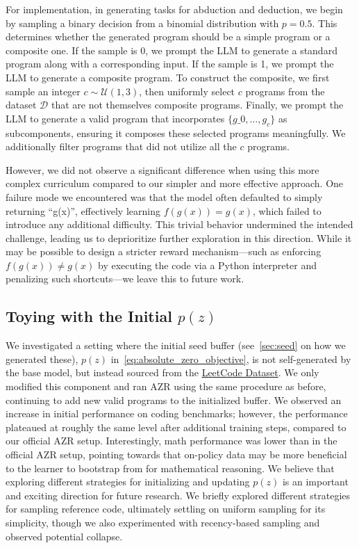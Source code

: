 \documentclass{article}
\begin{document}
For implementation, in generating tasks for abduction and deduction, we begin by sampling a binary decision from a binomial distribution with \(p = 0.5\). This determines whether the generated program should be a simple program or a composite one. If the sample is 0, we prompt the LLM to generate a standard program along with a corresponding input. If the sample is 1, we prompt the LLM to generate a composite program. To construct the composite, we first sample an integer \(c \sim \mathcal{U}(1, 3)\), then uniformly select \(c\) programs from the dataset \(\mathcal{D}\) that are not themselves composite programs. Finally, we prompt the LLM to generate a valid program that incorporates \(\{g\_0, \dots, g_c\}\) as subcomponents, ensuring it composes these selected programs meaningfully. We additionally filter programs that did not utilize all the \(c\) programs.

However, we did not observe a significant difference when using this more complex curriculum compared to our simpler and more effective approach. One failure mode we encountered was that the model often defaulted to simply returning “g(x)”, effectively learning \(f(g(x)) = g(x)\), which failed to introduce any additional difficulty. This trivial behavior undermined the intended challenge, leading us to deprioritize further exploration in this direction. While it may be possible to design a stricter reward mechanism—such as enforcing \(f(g(x)) \neq g(x)\) by executing the code via a Python interpreter and penalizing such shortcuts—we leave this to future work.

\subsection{Toying with the Initial $p(z)$}
We investigated a setting where the initial seed buffer (see~\cref{sec:seed} on how we generated these), \ie \(p(z)\) in~\cref{eq:absolute_zero_objective}, is not self-generated by the base model, but instead sourced from the \href{https://huggingface.co/datasets/newfacade/LeetCodeDataset}{LeetCode Dataset}. We only modified this component and ran AZR using the same procedure as before, continuing to add new valid programs to the initialized buffer. We observed an increase in initial performance on coding benchmarks; however, the performance plateaued at roughly the same level after additional training steps, compared to our official AZR setup. Interestingly, math performance was lower than in the official AZR setup, pointing towards that on-policy data may be more beneficial to the learner to bootstrap from for mathematical reasoning. We believe that exploring different strategies for initializing and updating \(p(z)\) is an important and exciting direction for future research. We briefly explored different strategies for sampling reference code, ultimately settling on uniform sampling for its simplicity, though we also experimented with recency-based sampling and observed potential collapse.
\end{document}
